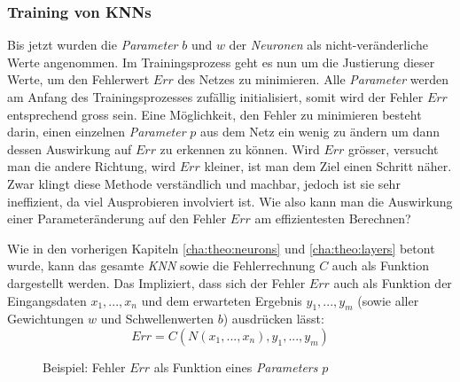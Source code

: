 \subsubsection{Training von KNNs}\label{cha:theo:backprop}
Bis jetzt wurden die \textit{Parameter} $b$ und $w$ der \textit{Neuronen} als nicht-veränderliche Werte angenommen. Im Trainingsprozess geht es nun um die Justierung dieser Werte, um den Fehlerwert $Err$ des Netzes zu minimieren. Alle \textit{Parameter} werden am Anfang des Trainingsprozesses zufällig initialisiert, somit wird der Fehler $Err$ entsprechend gross sein. Eine Möglichkeit, den Fehler zu minimieren besteht darin, einen einzelnen \textit{Parameter} $p$ aus dem Netz ein wenig zu ändern um dann dessen Auswirkung auf $Err$ zu erkennen zu können. Wird $Err$ grösser, versucht man die andere Richtung, wird $Err$ kleiner, ist man dem Ziel einen Schritt näher. Zwar klingt diese Methode verständlich und machbar, jedoch ist sie sehr ineffizient, da viel Ausprobieren involviert ist. Wie also kann man die Auswirkung einer Parameteränderung auf den Fehler $Err$ am effizientesten Berechnen?

Wie in den vorherigen Kapiteln \ref{cha:theo:neurons} und \ref{cha:theo:layers} betont wurde, kann das gesamte \textit{KNN} sowie die Fehlerrechnung $C$ auch als Funktion dargestellt werden. Das Impliziert, dass sich der Fehler $Err$ auch als Funktion der Eingangsdaten $x_1,...,x_n$ und dem erwarteten Ergebnis $y_1,...,y_m$ (sowie aller Gewichtungen $w$ und Schwellenwerten $b$) ausdrücken lässt:
\begin{equation}\label{eq:err_func}
Err = C(N(x_1,...,x_n), y_1,...,y_m)
\end{equation}



\begin{figure}[ht]
	\centering
	\caption[Sigmoid-Funktion]{Beispiel: Fehler $Err$ als Funktion eines \textit{Parameters} $p$}
	\label{plt:paraboloid}
\end{figure}



